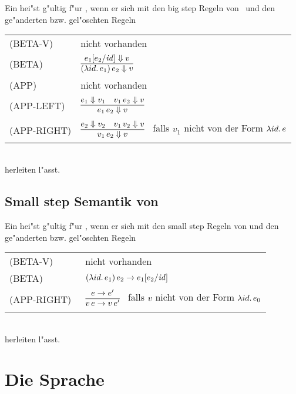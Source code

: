 Ein  hei"st g"ultig f"ur \LZEROCBN, wenn er sich mit den big step Regeln von \LZERO\ und den ge"anderten bzw. gel"oschten Regeln\\[5mm]
  \begin{tabular}{ll}
     \mbox{(BETA-V)}      & nicht vorhanden \\[3mm]
     \mbox{(BETA)}        & $\regel{e_1[e_2/\id] \eval v}
                                   {(\abstr{id}{e_1})\,e_2 \eval v}$ \\[5mm]
     \mbox{(APP)}         & nicht vorhanden \\[3mm]
     \mbox{(APP-LEFT)}    & $\regel{e_1 \eval v_1 \quad v_1\,e_2 \eval v}
                                   {e_1\,e_2 \eval v}$ \\[3mm]
     \mbox{(APP-RIGHT)}   & $\regel{e_2 \eval v_2 \quad v_1\,v_2 \eval v}
                                   {v_1\,e_2 \eval v}$   \ 
                                   falls ${v_1}$ nicht von der Form $\lambda id.\,e$
  \end{tabular}\\[7mm]
herleiten l"asst.


\subsection{Small step Semantik von \LZEROCBN}

Ein  hei"st g"ultig f"ur \LZEROCBN, wenn er sich mit den small step Regeln von \LZERO und den ge"anderten bzw. gel"oschten Regeln\\[5mm]
  \begin{tabular}{ll}
     \mbox{(BETA-V)}      & nicht vorhanden \\[3mm]
     \mbox{(BETA)}        & $(\lambda id.\,e_1)\,e_2 \to e_1[e_2/{\text{\it id\/}}]$ \\[5mm]
     \mbox{(APP-RIGHT)\ } & $\regel{e \to e'}
                                   {v\,e \to v\,e'}$   \ 
                                   falls ${v}$ nicht von der Form $\lambda id.\,e_0$
  \end{tabular}\\[7mm]
herleiten l"asst.



\section{Die Sprache \LONE}

